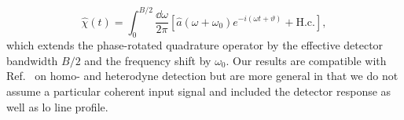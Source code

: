 \begin{equation}
	\hat\chi(t)
	=
	\int_0^{B/2}\frac{\dd{\omega}}{2\pi}
	\left[
		\hat{a}(\omega+\omega_0)
		e^{-i(\omega t+\vartheta)}
		+
		\text{H.c.}
	\right]
	,
\end{equation}
which extends the phase-rotated quadrature operator by the effective detector bandwidth $B/2$ and the frequency shift by $\omega_0$.
Our results are compatible with Ref.~\cite{Gardiner2000,Shapiro2009,Loudon2000,Vogel2006,Kikuchi2016} on homo- and heterodyne detection but are more general in that we do not assume a particular coherent input signal and included the detector response as well as \gls{lo} line profile.